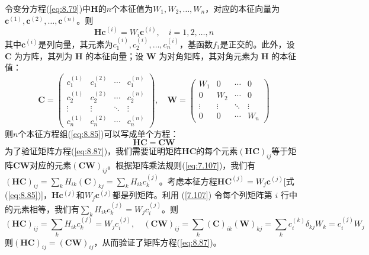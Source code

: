     令变分方程(\ref{eq:8.79})中$\mathbf{H}$的$n$个本征值为$W_1,W_2,\ldots,W_n$，对应的本征向量为$\mathbf{c}^{\left(1\right)},\mathbf{c}^{\left(2\right)},\ldots,\mathbf{c}^{\left(n\right)}$。则
    \begin{equation}
        \mathbf{H}\mathbf{c}^{\left(i\right)} = W_i\mathbf{c}^{\left(i\right)}, \quad i = 1,2,\ldots,n
        \label{eq:8.85}
    \end{equation}
    其中$\mathbf{c}^{\left(i\right)}$是列向量，其元素为$c_1^{\left(i\right)},c_2^{\left(i\right)},\ldots,c_n^{\left(i\right)}$，基函数$f_1$是正交的。此外，设 $\mathbf{C}$ 为方阵，其列为 $\mathbf{H}$ 的本征向量；设 $\mathbf{W}$ 为对角矩阵，其对角元素为 $\mathbf{H}$ 的本征值：
    \begin{equation}
        \mathbf{C} = \begin{pmatrix}
            c_1^{\left(1\right)} & c_1^{\left(2\right)} & \cdots & c_1^{\left(n\right)} \\
            c_2^{\left(1\right)} & c_2^{\left(2\right)} & \cdots & c_2^{\left(n\right)} \\
            \vdots & \vdots & \ddots & \vdots \\
            c_n^{\left(1\right)} & c_n^{\left(2\right)} & \cdots & c_n^{\left(n\right)}
        \end{pmatrix}, \quad \mathbf{W} = \begin{pmatrix}
            W_1 & 0 & \cdots & 0 \\
            0 & W_2 & \cdots & 0 \\
            \vdots & \vdots & \ddots & \vdots \\
            0 & 0 & \cdots & W_n
        \end{pmatrix}
        \label{eq:8.86}
    \end{equation}
    则$n$个本征方程组(\ref{eq:8.85})可以写成单个方程：
    \begin{equation}
        \mathbf{H}\mathbf{C} = \mathbf{C}\mathbf{W}
        \label{eq:8.87}
    \end{equation}
    为了验证矩阵方程(\ref{eq:8.87})，我们需要证明矩阵$\mathbf{HC}$的每个元素$\left(\mathbf{HC}\right)_{ij}$等于矩阵$\mathbf{CW}$对应的元素$\left(\mathbf{CW}\right)_{ij}$。根据矩阵乘法规则(\ref{eq:7.107})，我们有$\left(\mathbf{HC}\right)_{ij} = \sum_{k}H_{ik}\left(\mathbf{C}\right)_{kj} = \sum_{k}H_{ik}c_k^{\left(j\right)}$。考虑本征方程$\mathbf{H}\mathbf{C} ^{\left(j\right)} = W_j\mathbf{c}^{\left(j\right)}$[式(\ref{eq:8.85})]，$\mathbf{H}\mathbf{c}^{\left(j\right)}$和$W_j\mathbf{c}^{\left(j\right)}$都是列矩阵。利用 (\ref{7.107}) 令每个列矩阵第 $i$ 行中的元素相等，我们有$\sum_{k}H_{ik}c_k^{\left(j\right)} = W_jc_i^{\left(j\right)}$。则
    \begin{equation*}
        \left(\mathbf{HC}\right)_{ij} = \sum_{k}H_{ik}c_k^{\left(j\right)} = W_jc_i^{\left(j\right)}, \quad \left(\mathbf{CW}\right)_{ij} = \sum_{k}\left(\mathbf{C}\right)_{ik}\left(\mathbf{W}\right)_{kj} = \sum_{k}c_i^{\left(k\right)}\delta_{kj}W_k = c_i^{\left(j\right)}W_j
    \end{equation*}
    则$\left(\mathbf{HC}\right)_{ij} = \left(\mathbf{CW}\right)_{ij}$，从而验证了矩阵方程(\ref{eq:8.87})。

